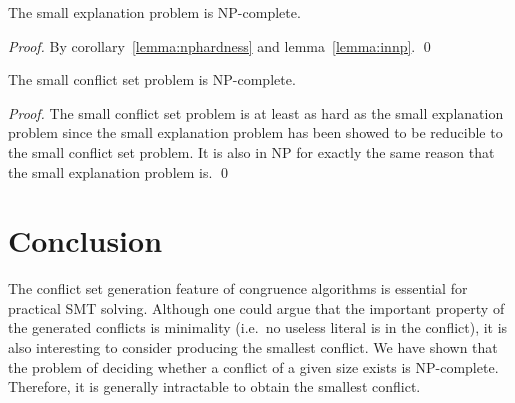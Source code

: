 \documentclass[smallextended]{svjour3}
\begin{document}
\begin{theorem}
The small explanation problem is NP-complete.
\end{theorem}
\begin{proof}
By corollary~\ref{lemma:nphardness} and lemma~\ref{lemma:innp}.
\qed
\end{proof}

\begin{theorem}
The small conflict set problem is NP-complete.
\end{theorem}
\begin{proof}
The small conflict set problem is at least as hard as the small explanation problem since the small explanation problem has been showed to be reducible to the small conflict set problem.  It is also in NP for exactly the same reason that the small explanation problem is.
\qed
\end{proof}


\section{Conclusion}

The conflict set generation feature of congruence algorithms is essential for
practical SMT solving.  Although one could argue that the important property of the generated conflicts is minimality (i.e.\ no useless literal is in the conflict), it is also interesting to consider producing the smallest conflict.  We have shown that the problem of deciding whether a conflict of a given size exists is NP-complete. Therefore, it is generally intractable to obtain the smallest conflict. 
\end{document}
